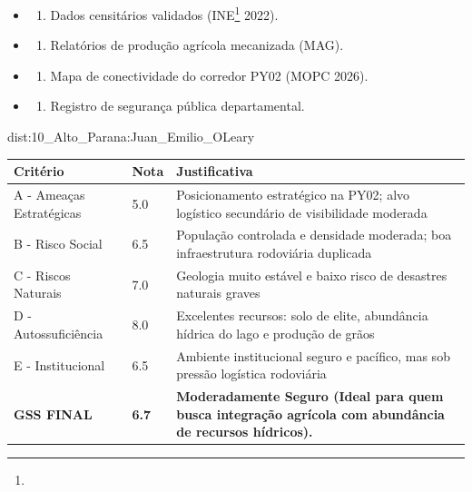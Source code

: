 {\begin{itemize}
\tightlist
\item
  \begin{enumerate}
  \def\labelenumi{\arabic{enumi})}
  \tightlist
  \item
    Dados censitários validados (INE\footnote{\fineINE} 2022).
  \end{enumerate}
\item
  \begin{enumerate}
  \def\labelenumi{\arabic{enumi})}
  \setcounter{enumi}{1}
  \tightlist
  \item
    Relatórios de produção agrícola mecanizada (MAG).
  \end{enumerate}
\item
  \begin{enumerate}
  \def\labelenumi{\arabic{enumi})}
  \setcounter{enumi}{2}
  \tightlist
  \item
    Mapa de conectividade do corredor PY02 (MOPC 2026).
  \end{enumerate}
\item
  \begin{enumerate}
  \def\labelenumi{\arabic{enumi})}
  \setcounter{enumi}{3}
  \tightlist
  \item
    Registro de segurança pública departamental.
  \end{enumerate}
\end{itemize}}{dist:10_Alto_Parana:Juan_Emilio_OLeary}
\begin{table}[ht!]
\small \begin{tabular}{p{3.0cm}p{0.8cm}p{6.0cm}} \toprule
\textbf{Critério} & \textbf{Nota} & \textbf{Justificativa} \\ \midrule
A - Ameaças Estratégicas & 5.0 & Posicionamento estratégico na PY02; alvo logístico secundário de visibilidade moderada \\
B - Risco Social & 6.5 & População controlada e densidade moderada; boa infraestrutura rodoviária duplicada \\
C - Riscos Naturais & 7.0 & Geologia muito estável e baixo risco de desastres naturais graves \\
D - Autossuficiência & 8.0 & Excelentes recursos: solo de elite, abundância hídrica do lago e produção de grãos \\
E - Institucional & 6.5 & Ambiente institucional seguro e pacífico, mas sob pressão logística rodoviária \\
\midrule \textbf{GSS FINAL} & \textbf{6.7} & \textbf{Moderadamente Seguro (Ideal para quem busca integração agrícola com abundância de recursos hídricos).} \\ \bottomrule \end{tabular}
\end{table}
